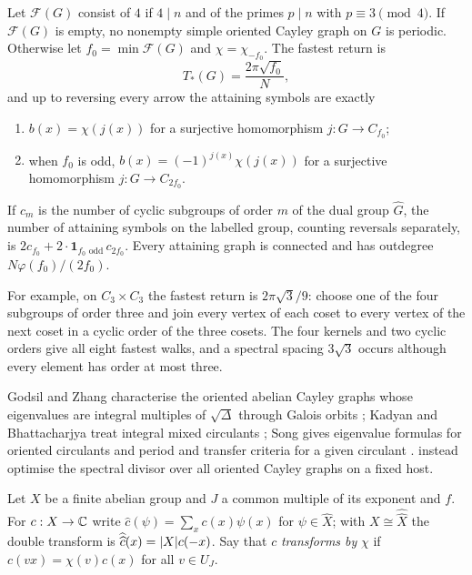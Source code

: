 \begin{theorem}\label{gra:thm:cayleyfast}
Let $\mathcal F(G)$ consist of $4$ if $4\mid n$ and of the primes $p\mid n$
with $p\equiv3\pmod4$. If $\mathcal F(G)$ is empty, no nonempty simple
oriented Cayley graph on $G$ is periodic. Otherwise let $f_0=\min\mathcal
F(G)$ and $\chi=\chi_{-f_0}$. The fastest return is
\[
 T_*(G)=\frac{2\pi\sqrt{f_0}}N ,
\]
and up to reversing every arrow the attaining symbols are exactly
\begin{enumerate}[label=\textup{(\roman*)}]
\item $b(x)=\chi(j(x))$ for a surjective homomorphism $j:G\to C_{f_0}$;
\item when $f_0$ is odd, $b(x)=(-1)^{j(x)}\chi(j(x))$ for a surjective
homomorphism $j:G\to C_{2f_0}$.
\end{enumerate}
If $c_m$ is the number of cyclic subgroups of order $m$ of the dual group
$\widehat G$, the number of attaining symbols on the labelled group,
counting reversals separately, is
$2c_{f_0}+2\cdot\mathbf 1_{f_0\text{ odd}}\,c_{2f_0}$. Every attaining graph
is connected and has outdegree $N\varphi(f_0)/(2f_0)$.
\end{theorem}

For example, on $C_3\times C_3$ the fastest return is $2\pi\sqrt3/9$:
choose one of the four subgroups of order three and join every vertex of
each coset to every vertex of the next coset in a cyclic order of the three
cosets. The four kernels and two cyclic orders give all eight fastest
walks, and a spectral spacing $3\sqrt3$ occurs although every element has
order at most three.

Godsil and Zhang characterise the oriented abelian Cayley graphs whose
eigenvalues are integral multiples of $\sqrt\Delta$ through Galois orbits
\cite[Theorem~8.1]{GodsilZhang2024Oriented}; Kadyan and Bhattacharjya
treat integral mixed circulants \cite{KadyanBhattacharjya2023Integral};
Song gives eigenvalue formulas for oriented circulants and period and
transfer criteria for a given circulant \cite{Song2026Perfect}.
 instead optimise the
spectral divisor over all oriented Cayley graphs on a fixed host.

Let $X$ be a finite abelian group and $J$ a common multiple of its exponent
and $f$. For $c:X\to\mathbb{C}$ write $\widehat c(\psi)=\sum_xc(x)\psi(x)$ for
$\psi\in\widehat X$; with $X\cong\widehat{\widehat X}$ the double transform
is $\widehat{\widehat c}(x)=\lvert X\rvert c(-x)$. Say that $c$ \emph{transforms by}
$\chi$ if $c(vx)=\chi(v)c(x)$ for all $v\in U_J$.

